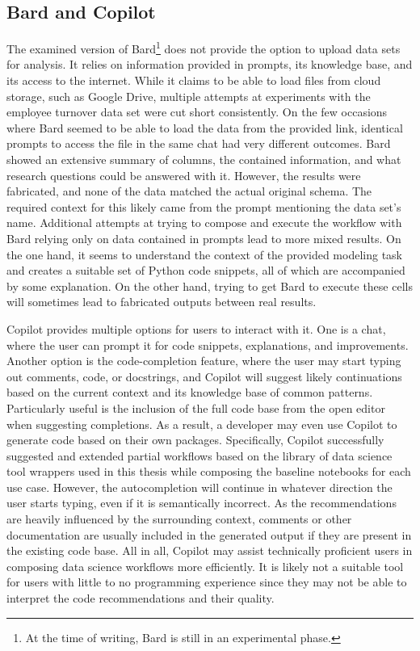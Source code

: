 \subsection{Bard and Copilot}
The examined version of Bard\footnote{At the time of writing, Bard is still in an experimental phase.} does not provide the option to upload data sets for analysis. It relies on information provided in prompts, its knowledge base, and its access to the internet. While it claims to be able to load files from cloud storage, such as Google Drive, multiple attempts at experiments with the employee turnover data set were cut short consistently. On the few occasions where Bard seemed to be able to load the data from the provided link, identical prompts to access the file in the same chat had very different outcomes. Bard showed an extensive summary of columns, the contained information, and what research questions could be answered with it. However, the results were fabricated, and none of the data matched the actual original schema. The required context for this likely came from the prompt mentioning the data set's name. Additional attempts at trying to compose and execute the workflow with Bard relying only on data contained in prompts lead to more mixed results. On the one hand, it seems to understand the context of the provided modeling task and creates a suitable set of Python code snippets, all of which are accompanied by some explanation. On the other hand, trying to get Bard to execute these cells will sometimes lead to fabricated outputs between real results.

Copilot provides multiple options for users to interact with it. One is a chat, where the user can prompt it for code snippets, explanations, and improvements. Another option is the code-completion feature, where the user may start typing out comments, code, or docstrings, and Copilot will suggest likely continuations based on the current context and its knowledge base of common patterns. Particularly useful is the inclusion of the full code base from the open editor when suggesting completions. As a result, a developer may even use Copilot to generate code based on their own packages. Specifically, Copilot successfully suggested and extended partial workflows based on the library of data science tool wrappers used in this thesis while composing the baseline notebooks for each use case. However, the autocompletion will continue in whatever direction the user starts typing, even if it is semantically incorrect. As the recommendations are heavily influenced by the surrounding context, comments or other documentation are usually included in the generated output if they are present in the existing code base. All in all, Copilot may assist technically proficient users in composing data science workflows more efficiently. It is likely not a suitable tool for users with little to no programming experience since they may not be able to interpret the code recommendations and their quality.

